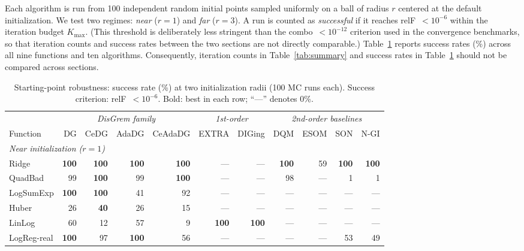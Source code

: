 \documentclass[11pt,a4paper]{article}
\begin{document}
	Each algorithm is run from 100 independent random initial points
	sampled uniformly on a ball of radius $r$ centered at the default
	initialization.
	We test two regimes: \textit{near} ($r{=}1$) and \textit{far}
	($r{=}3$).
	A run is counted as \emph{successful} if it reaches relF~$<10^{-6}$
	within the iteration budget $K_{\max}$.
	(This threshold is deliberately less stringent than the combo~$<10^{-12}$
	criterion used in the convergence benchmarks, so that iteration counts
	and success rates between the two sections are not directly comparable.)
	Table~\ref{tab:robust} reports
	success rates (\%) across all nine functions and ten algorithms.
	Consequently, iteration counts in Table~\ref{tab:summary}
	and success rates in Table~\ref{tab:robust}
	should not be compared across sections.
	
	\begin{table}[t]
		\centering
		\caption{Starting-point robustness: success rate (\%) at two initialization radii (100 MC runs each).
			Success criterion: relF~$<10^{-6}$.
			Bold: best in each row; ``---'' denotes 0\%.}
		\label{tab:robust}
		\setlength{\tabcolsep}{4pt}
		\small
		\begin{tabular}{l rrrr rr rrrr}
			\toprule
			& \multicolumn{4}{c}{\textit{DisGrem family}}
			& \multicolumn{2}{c}{\textit{1st-order}}
			& \multicolumn{4}{c}{\textit{2nd-order baselines}} \\
			\cmidrule(lr){2-5}\cmidrule(lr){6-7}\cmidrule(lr){8-11}
			Function & DG & CeDG & AdaDG & CeAdaDG
			& EXTRA & DIGing & DQM & ESOM & SON & N-GI \\
			\midrule
			\multicolumn{11}{l}{\textit{Near initialization ($r{=}1$)}} \\
			\midrule
			Ridge       & \textbf{100} & \textbf{100} & \textbf{100} & \textbf{100} & --- & --- & \textbf{100} & 59 & \textbf{100} & \textbf{100} \\
			QuadBad     & 99 & \textbf{100} & 99  & \textbf{100} & --- & --- & 98  & --- & 1   & 1   \\
			LogSumExp   & \textbf{100} & \textbf{100} & 41  & 92  & --- & --- & --- & --- & --- & --- \\
			Huber       & 26 & \textbf{40}  & 26  & 15  & --- & --- & --- & --- & --- & --- \\
			LinLog      & 60 & 12  & 57  & 9   & \textbf{100} & \textbf{100} & --- & --- & --- & --- \\
			LogReg-real & \textbf{100} & 97  & \textbf{100} & 56  & --- & --- & --- & --- & 53  & 49  \\

\end{tabular}
\end{table}
\end{document}
